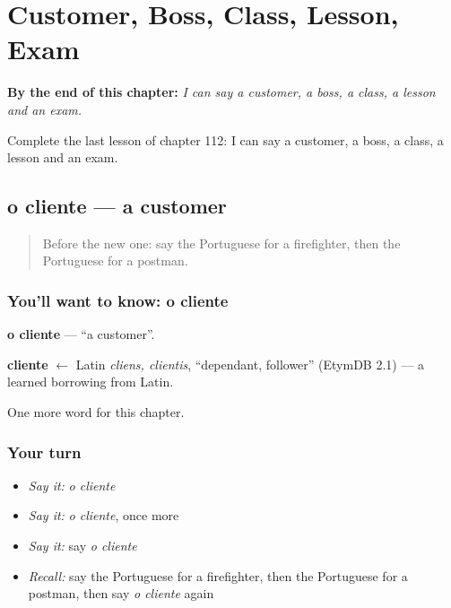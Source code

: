 
\chapter{Customer, Boss, Class, Lesson, Exam}
\label{ch:pt-customer-boss-class-lesson-exam}

\begin{chapteropening}
\textbf{By the end of this chapter:} \emph{I can say a customer, a boss, a class, a lesson and an exam.}

Complete the last lesson of chapter 112: I can say a customer, a boss, a class, a lesson and an exam.
\end{chapteropening}

\section[o cliente]{o cliente — a customer}

\label{lesson:PT-C112-cliente}



\begin{quote}
Before the new one: say the Portuguese for a firefighter, then the Portuguese for a postman.
\end{quote}

\subsection*{You'll want to know: o cliente}
\textbf{o cliente} — \textquotedblleft{}a customer\textquotedblright{}.

\begin{cousinweb}
\textbf{cliente} $\leftarrow$ Latin \emph{cliens, clientis}, \textquotedblleft{}dependant, follower\textquotedblright{} (EtymDB 2.1) — a learned borrowing from Latin.
\end{cousinweb}

\begin{grammarlens}[title={What you've built}]
One more word for this chapter.
\end{grammarlens}

\subsection*{Your turn}
\begin{itemize}
\raggedright
  \item \emph{Say it:} \emph{o cliente}
  \item \emph{Say it:} \emph{o cliente}, once more
  \item \emph{Say it:} say \emph{o cliente}
  \item \emph{Recall:} say the Portuguese for a firefighter, then the Portuguese for a postman, then say \emph{o cliente} again
\end{itemize}

